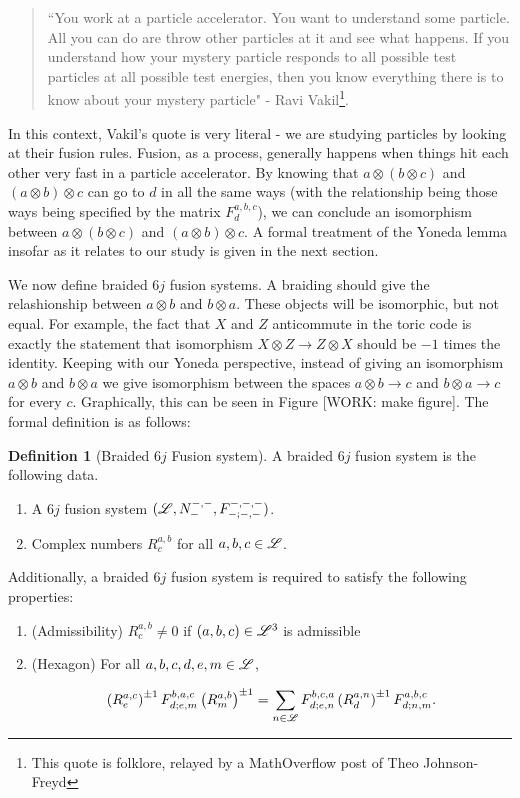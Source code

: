 \documentclass{article}
\theoremstyle{definition}
\newtheorem*{definition}{Definition}
\numberwithin{figure}{section}
\begin{document}
\begin{quote}
``You work at a particle accelerator. You want to understand some particle. All you can do are throw other particles at it and see what happens. If you understand how your mystery particle responds to all possible test particles at all possible test energies, then you know everything there is to know about your mystery particle" - Ravi Vakil\footnote{This quote is folklore, relayed by a MathOverflow post of Theo Johnson-Freyd}.
\end{quote}

In this context, Vakil's quote is very literal - we are studying particles by looking at their fusion rules. Fusion, as a process, generally happens when things hit each other very fast in a particle accelerator. By knowing that $a\otimes (b\otimes c)$ and $(a\otimes b)\otimes c$ can go to $d$ in all the same ways (with the relationship being those ways being specified by the matrix $F^{a,b,c}_d$), we can conclude an isomorphism between $a\otimes (b\otimes c)$ and $(a\otimes b)\otimes c$. A formal treatment of the Yoneda lemma insofar as it relates to our study is given in the next section.

We now define braided $6j$ fusion systems. A braiding should give the relashionship between $a\otimes b$ and $b\otimes a$. These objects will be isomorphic, but not equal. For example, the fact that $X$ and $Z$ anticommute in the toric code is exactly the statement that isomorphism $X\otimes Z\to Z\otimes X$ should be $-1$ times the identity. Keeping with our Yoneda perspective, instead of giving an isomorphism $a\otimes b$ and $b\otimes a$ we give isomorphism between the spaces $a\otimes b\to c$ and $b\otimes a\to c$ for every $c$. Graphically, this can be seen in Figure [WORK: make figure]. The formal definition is as follows:

\begin{definition}[Braided $6j$ Fusion system] A braided $6j$ fusion system is the following data.

\begin{enumerate}
\item A $6j$ fusion system $(\mathscr{L}, N_{\--}^{\--,\--},F^{\--,\--,\--}_{\--;\--,\--})$.
\item Complex numbers $R^{a,b}_{c}$ for all $a,b,c\in \mathscr{L}$.
\end{enumerate}

Additionally, a braided $6j$ fusion system is required to satisfy the following properties:

\begin{enumerate}

\item (Admissibility) $R^{a,b}_{c}\neq 0$ if $(a,b,c)\in \mathscr{L}^3$ is admissible

\item (Hexagon) For all $a,b,c,d,e,m\in\mathscr{L}$,

$$\left(R^{a,c}_{e}\right)^{\pm 1}F^{b,a,c}_{d;e,m}\left(R^{a,b}_{m}\right)^{\pm 1}=\sum_{n\in \mathscr{L}} F^{b,c,a}_{d;e,n}\left(R^{a,n}_{d}\right)^{\pm 1}F^{a,b,c}_{d;n,m}.$$
\end{enumerate}
\raggedleft\qedsymbol{}
\end{definition}
\end{document}
